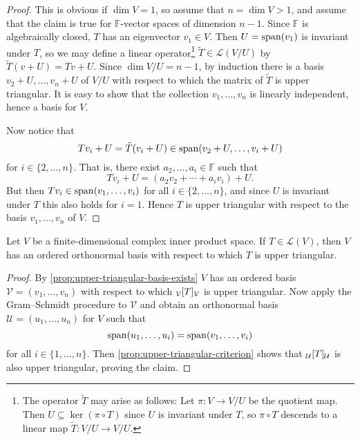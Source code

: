 \documentclass[article, a4paper, 11pt, oneside]{memoir}
\numberwithin{equation}{chapter}
\newcommand{\calL}{\mathcal{L}}
\newcommand{\calV}{\mathcal{V}}
\newcommand{\calU}{\mathcal{U}}
\newcommand{\field}{\mathbb{F}}
\begin{document}
\begin{proof}
    This is obvious if $\dim V = 1$, so assume that $n = \dim V > 1$, and assume that the claim is true for $\field$-vector spaces of dimension $n-1$. Since $\field$ is algebraically closed, $T$ has an eigenvector $v_1 \in V$. Then $U = \operatorname{span}(v_1)$ is invariant under $T$, so we may define a linear operator\footnote{The operator $\tilde T$ may arise as follows: Let $\pi \colon V \to V/U$ be the quotient map. Then $U \subseteq \ker (\pi \circ T)$ since $U$ is invariant under $T$, so $\pi \circ T$ descends to a linear map $\tilde T \colon V/U \to V/U$.} $\tilde T \in \calL(V/U)$ by $\tilde T(v + U) = Tv + U$. Since $\dim V/U = n-1$, by induction there is a basis $v_2 + U, \ldots, v_n + U$ of $V/U$ with respect to which the matrix of $\tilde T$ is upper triangular. It is easy to show that the collection $v_1, \ldots, v_n$ is linearly independent, hence a basis for $V$.

    Now notice that
    \begin{equation*}
        Tv_i + U
            = \tilde T(v_i + U)
            \in \operatorname{span}(v_2 + U, \ldots, v_i + U)
    \end{equation*}
    for $i \in \{2, \ldots, n\}$. That is, there exist $a_2, \ldots, a_i \in \field$ such that
    \begin{equation*}
        Tv_i + U
            = (a_2 v_2 + \cdots + a_i v_i) + U.
    \end{equation*}
    But then $Tv_i \in \operatorname{span}(v_1, \ldots, v_i)$ for all $i \in \{2, \ldots, n\}$, and since $U$ is invariant under $T$ this also holds for $i = 1$. Hence $T$ is upper triangular with respect to the basis $v_1, \ldots, v_n$ of $V$.
\end{proof}


\begin{theorem}
    Let $V$ be a finite-dimensional complex inner product space. If $T \in \calL(V)$, then $V$ has an ordered orthonormal basis with respect to which $T$ is upper triangular.
\end{theorem}

\begin{proof}
    By \cref{prop:upper-triangular-basis-exists} $V$ has an ordered basis $\calV = (v_1, \ldots, v_n)$ with respect to which $\mr{\calV}{T}{\calV}$ is upper triangular. Now apply the Gram--Schmidt procedure to $\calV$ and obtain an orthonormal basis $\calU = (u_1, \ldots, u_n)$ for $V$ such that
    \begin{equation*}
        \operatorname{span}(u_1, \ldots, u_i)
            = \operatorname{span}(v_1, \ldots, v_i)
    \end{equation*}
    for all $i \in \{1, \ldots, n\}$. Then \cref{prop:upper-triangular-criterion} shows that $\mr{\calU}{T}{\calU}$ is also upper triangular, proving the claim.
\end{proof}
\end{document}
